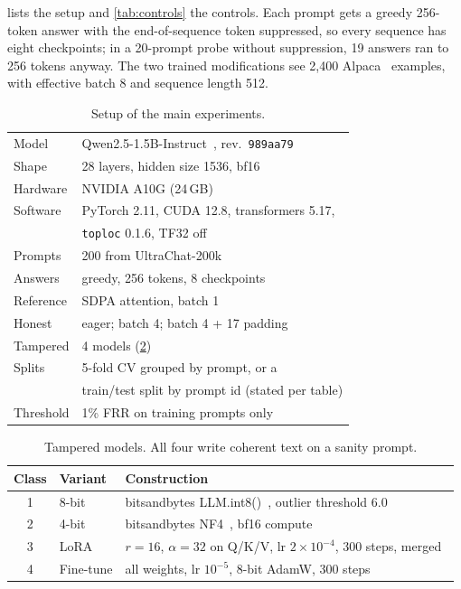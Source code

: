 \documentclass[10pt,twocolumn]{article}
\begin{document}
 lists the setup and \cref{tab:controls} the controls.
Each prompt gets a greedy 256-token answer with the end-of-sequence token suppressed, so every sequence has eight checkpoints; in a 20-prompt probe without suppression, 19 answers ran to 256 tokens anyway.
The two trained modifications see 2{,}400 Alpaca~\cite{taori2023alpaca} examples, with effective batch 8 and sequence length 512.

\begin{table}[!htb]
\centering
\small
\caption{Setup of the main experiments.}
\label{tab:setup}
\begin{tabular}{@{}ll@{}}
\toprule
Model & Qwen2.5-1.5B-Instruct~\cite{qwen2025qwen25}, rev.\ \texttt{989aa79} \\
Shape & 28 layers, hidden size 1536, bf16 \\
Hardware & NVIDIA A10G (24\,GB) \\
Software & PyTorch 2.11, CUDA 12.8, transformers 5.17, \\
 & \texttt{toploc} 0.1.6, TF32 off \\
Prompts & 200 from UltraChat-200k~\cite{ding2023ultrachat} \\
Answers & greedy, 256 tokens, 8 checkpoints \\
Reference & SDPA attention, batch 1 \\
Honest & eager; batch 4; batch 4 + 17 padding \\
Tampered & 4 models (\cref{tab:variants}) \\
Splits & 5-fold CV grouped by prompt, or a \\
 & train/test split by prompt id (stated per table) \\
Threshold & 1\% FRR on training prompts only \\
\bottomrule
\end{tabular}
\end{table}

\begin{table}[!t]
\centering
\small
\caption{Tampered models. All four write coherent text on a sanity prompt.}
\label{tab:variants}
\begin{tabular}{@{}cll@{}}
\toprule
Class & Variant & Construction \\
\midrule
1 & 8-bit     & bitsandbytes LLM.int8()~\cite{dettmers2022llmint8}, outlier threshold 6.0 \\
2 & 4-bit     & bitsandbytes NF4~\cite{dettmers2023qlora}, bf16 compute \\
3 & LoRA      & $r{=}16$, $\alpha{=}32$ on Q/K/V, lr $2{\times}10^{-4}$, 300 steps, merged~\cite{hu2022lora} \\
4 & Fine-tune & all weights, lr $10^{-5}$, 8-bit AdamW, 300 steps \\
\bottomrule
\end{tabular}
\end{table}
\end{document}
